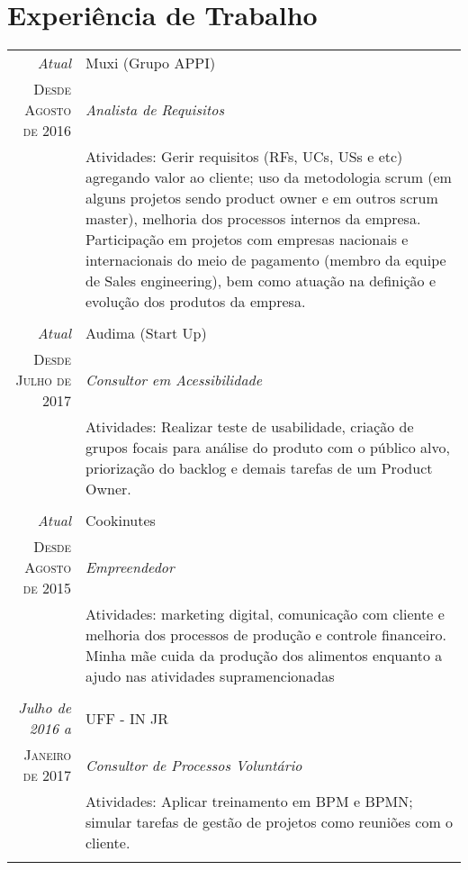 \documentclass[a4paper,10pt]{article}
\begin{document}
\section{Experiência de Trabalho}
\begin{tabular}{r|p{10cm}}
 \emph{Atual} & Muxi (Grupo APPI) \\
 \textsc{Desde Agosto de 2016}&\emph{Analista de Requisitos}\\
 &\footnotesize{Atividades: Gerir requisitos (RFs, UCs, USs e etc) agregando valor ao cliente; uso da metodologia scrum (em alguns projetos sendo product owner e em outros scrum master), melhoria dos processos internos da empresa. Participação em projetos com empresas nacionais e internacionais do meio de pagamento (membro da equipe de Sales engineering), bem como atuação na definição e evolução dos produtos da empresa.}\\
  
 & \\
 
 \emph{Atual} & Audima (Start Up) \\
 \textsc{Desde Julho de 2017}&\emph{Consultor em Acessibilidade}\\
 &\footnotesize{Atividades: Realizar teste de usabilidade, criação de grupos focais para análise do produto com o público alvo, priorização do backlog e demais tarefas de um Product Owner.}\\
 
 & \\
 
 \emph{Atual} & Cookinutes \\
 \textsc{Desde Agosto de 2015}&\emph{Empreendedor}\\
 &\footnotesize{Atividades: marketing digital, comunicação com cliente e melhoria dos processos de produção e controle financeiro. Minha mãe cuida da produção dos alimentos enquanto a ajudo nas atividades supramencionadas}\\
 
 & \\
 
 \emph{Julho de 2016 a} & UFF - IN JR \\
 \textsc{Janeiro de 2017}&\emph{Consultor de Processos Voluntário}\\
 &\footnotesize{Atividades: Aplicar treinamento em BPM e BPMN; simular tarefas de gestão de projetos como reuniões com o cliente.}\\
 
 & \\
 

\end{tabular}
\end{document}
